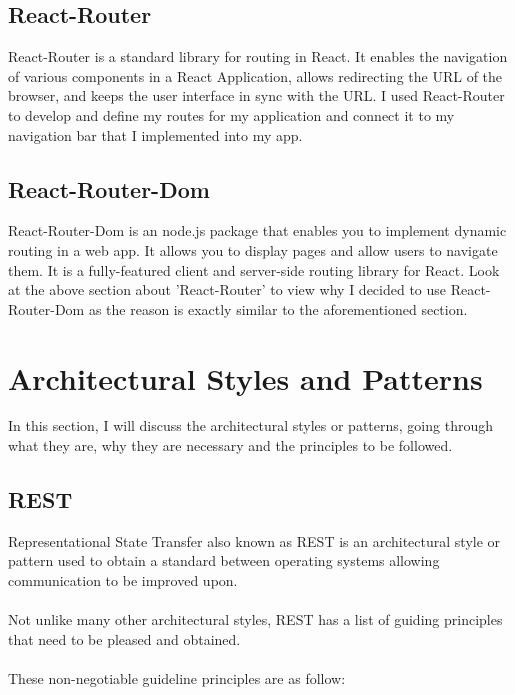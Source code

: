 \subsection{React-Router}

React-Router is a standard library for routing in React. It enables the navigation of various components in a React Application, allows redirecting the URL of the browser, and keeps the user interface in sync with the URL. I used React-Router to develop and define my routes for my application and connect it to my navigation bar that I implemented into my app.

\subsection{React-Router-Dom}

React-Router-Dom is an node.js package that enables you to implement dynamic routing in a web app. It allows you to display pages and allow users to navigate them. It is a fully-featured client and server-side routing library for React. Look at the above section about 'React-Router' to view why I decided to use React-Router-Dom as the reason is exactly similar to the aforementioned section.

\section{Architectural Styles and Patterns}

In this section, I will discuss the architectural styles or patterns, going through what they are, why they are necessary and the principles to be followed.

\subsection{REST}

Representational State Transfer also known as REST is an architectural style or pattern used to obtain a standard between operating systems allowing communication to be improved upon.\\ \\
Not unlike many other architectural styles, REST has a list of guiding principles that need to be pleased and obtained.\\ \\
These non-negotiable guideline principles are as follow:

